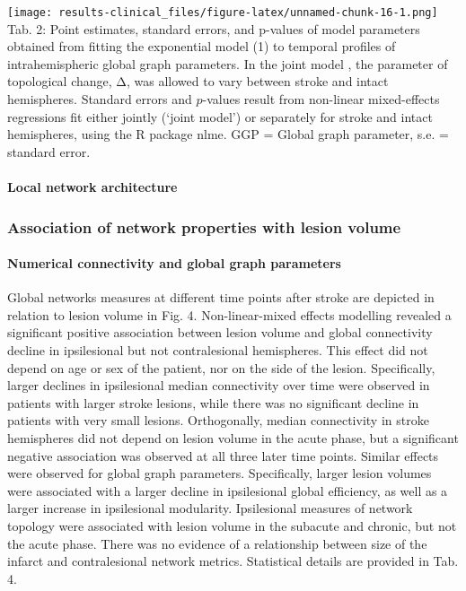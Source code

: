 \documentclass[]{article}
\let\oldparagraph\paragraph
\renewcommand{\paragraph}[1]{\oldparagraph{#1}\mbox{}}
\begin{document}
\texttt{[image: results-clinical\_files/figure-latex/unnamed-chunk-16-1.png]}
Tab. 2: Point estimates, standard errors, and p-values of model
parameters obtained from fitting the exponential model (1) to temporal
profiles of intrahemispheric global graph parameters. In the joint model
, the parameter of topological change, Δ, was allowed to vary between
stroke and intact hemispheres. Standard errors and \(p\)-values result
from non-linear mixed-effects regressions fit either jointly (`joint
model') or separately for stroke and intact hemispheres, using the R
package nlme. GGP = Global graph parameter, s.e. = standard error.

\hypertarget{local-network-architecture}{%
\paragraph{Local network
architecture}\label{local-network-architecture}}

\hypertarget{association-of-network-properties-with-lesion-volume}{%
\subsubsection{Association of network properties with lesion
volume}\label{association-of-network-properties-with-lesion-volume}}

\hypertarget{numerical-connectivity-and-global-graph-parameters}{%
\paragraph{Numerical connectivity and global graph
parameters}\label{numerical-connectivity-and-global-graph-parameters}}

Global networks measures at different time points after stroke are
depicted in relation to lesion volume in Fig. 4. Non-linear-mixed
effects modelling revealed a significant positive association between
lesion volume and global connectivity decline in ipsilesional but not
contralesional hemispheres. This effect did not depend on age or sex of
the patient, nor on the side of the lesion. Specifically, larger
declines in ipsilesional median connectivity over time were observed in
patients with larger stroke lesions, while there was no significant
decline in patients with very small lesions. Orthogonally, median
connectivity in stroke hemispheres did not depend on lesion volume in
the acute phase, but a significant negative association was observed at
all three later time points. Similar effects were observed for global
graph parameters. Specifically, larger lesion volumes were associated
with a larger decline in ipsilesional global efficiency, as well as a
larger increase in ipsilesional modularity. Ipsilesional measures of
network topology were associated with lesion volume in the subacute and
chronic, but not the acute phase. There was no evidence of a
relationship between size of the infarct and contralesional network
metrics. Statistical details are provided in Tab. 4.
\end{document}
